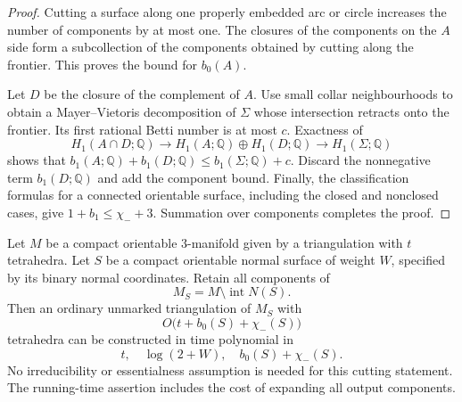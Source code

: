 \begin{proof}
Cutting a surface along one properly embedded arc or circle increases the
number of components by at most one.  The closures of the components on the
$A$ side form a subcollection of the components obtained by cutting along
the frontier.  This proves the bound for $b_0(A)$.

Let $D$ be the closure of the complement of $A$.  Use small collar
neighbourhoods to obtain a Mayer--Vietoris decomposition of $\Sigma$ whose
intersection retracts onto the frontier.  Its first rational Betti number
is at most $c$.  Exactness of
\[
 H_1(A\cap D;\mathbb Q)\longrightarrow
 H_1(A;\mathbb Q)\oplus H_1(D;\mathbb Q)
 \longrightarrow H_1(\Sigma;\mathbb Q)
\]
shows that
$b_1(A;\mathbb Q)+b_1(D;\mathbb Q)
\leq b_1(\Sigma;\mathbb Q)+c$.
Discard the nonnegative term $b_1(D;\mathbb Q)$ and add the component bound.
Finally, the classification formulas for a connected orientable surface,
including the closed and nonclosed cases, give
$1+b_1\leq\chi_-+3$.  Summation over components completes the proof.
\end{proof}

\begin{corollary}
\label{cor:normal-cut-reconstruction}
Let $M$ be a compact orientable $3$-manifold given by a triangulation with
$t$ tetrahedra.  Let $S$ be a compact orientable normal surface of weight
$W$, specified by its binary normal coordinates.  Retain all components of
\[
  M_S=M\setminus\operatorname{int}N(S).
\]
Then an ordinary unmarked triangulation of $M_S$ with
\[
  O\bigl(t+b_0(S)+\chi_-(S)\bigr)
\]
tetrahedra can be constructed in time polynomial in
\[
  t,\quad \log(2+W),\quad b_0(S)+\chi_-(S).
\]
No irreducibility or essentialness assumption is needed for this cutting
statement.  The running-time assertion includes the cost of expanding all
output components.
\end{corollary}

